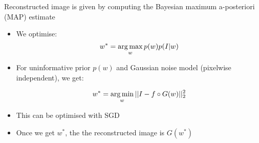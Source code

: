 \newcommand{\ci}[1]{\circ{#1}}
\newcommand{\wplus}{$\mathcal{W}^{+}$ }
\newcommand{\loss}{\mathcal{L}}

\newcommand{\bit}[1]{\begin{itemize} 
\item #1
\end{itemize}}

\begin{frame}{Reconstructed image is given by computing the Bayesian maximum a-posteriori (MAP) estimate\\
}



\begin{itemize}
 \item We optimise:
$$ w^* = \operatorname*{arg\,max}_w p(w)p(I|w)$$

\item For uninformative prior $p(w)$ and Gaussian noise model (pixelwise independent), we get:

$$ w^* = \operatorname*{arg\,min}_w || I - f \circ G (w) ||_2^2$$

\item This can be optimised with SGD

\item Once we get $w^*$, the the reconstructed image is $G(w^*)$

\end{itemize}

\begin{center}
\vt
\brgmoursshortloss
\end{center}
 
\end{frame}
% 

